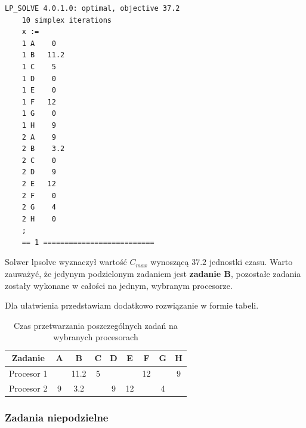 \documentclass[
    12pt, %
]{../fphw}
\begin{document}
\newpage

\begin{lstlisting}[caption=Rozwiązanie znalezione solwerem lpsolve]
    LP_SOLVE 4.0.1.0: optimal, objective 37.2
    10 simplex iterations
    x :=
    1 A    0
    1 B   11.2
    1 C    5
    1 D    0
    1 E    0
    1 F   12
    1 G    0
    1 H    9
    2 A    9
    2 B    3.2
    2 C    0
    2 D    9
    2 E   12
    2 F    0
    2 G    4
    2 H    0
    ;
    == 1 ==========================
\end{lstlisting}
Solwer lpsolve wyznaczył wartość \(C_{max}\) wynoszącą \(37.2\) jednostki czasu.
Warto zauważyć, że jedynym podzielonym zadaniem jest \textbf{zadanie B},
pozostałe zadania zostały wykonane w całości na jednym, wybranym procesorze.

Dla ułatwienia przedstawiam dodatkowo rozwiązanie w formie tabeli.
\begin{table}[H]
    \centering
    \begin{tabular}{| c | c | c | c | c | c | c | c | c |}
        \hline
        Zadanie    & A & B    & C & D & E  & F  & G & H \\
        \hline
        Procesor 1 &   & 11.2 & 5 &   &    & 12 &   & 9 \\
        \hline
        Procesor 2 & 9 & 3.2  &   & 9 & 12 &    & 4 &   \\
        \hline
    \end{tabular}
    \caption{Czas przetwarzania poszczególnych zadań na wybranych procesorach}
\end{table}

\subsubsection{Zadania niepodzielne}
\end{document}
